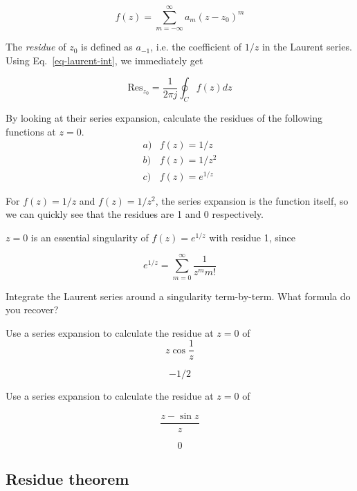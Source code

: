 \begin{equation}
f(z)= \sum_{m=-\infty}^{\infty} a_m (z-z_0)^m
\end{equation} 

The \emph{residue} of $z_0$ is defined as $a_{-1}$, i.e. the coefficient of $1/z$ in the Laurent series. Using Eq.~\ref{eq-laurent-int}, we immediately get

\begin{equation}
\mathrm{Res}_{z_0}=\frac{1}{2 \pi j }  \oint_{{C}} f(z) dz \label{eq-res-int}
\end{equation}

\begin{cue}
  By looking at their series expansion, calculate the residues of the following functions at $z=0$.
  $$\begin{array}{lcll}a) & f(z)=1/z \\b) & f(z)=1/z^2 \\c) & f(z)=e^{1/z}\end{array}$$
\end{cue}

For $f(z)=1/z$ and $f(z)=1/z^2$, the series expansion is the function itself, so we can quickly see that the residues are 1 and 0 respectively.

$z=0$ is an essential singularity of $f(z)=e^{1/z}$ with residue 1, since

$$e^{1/z} = \sum_{m=0}^{\infty} \frac{1}{z^m m!} $$

\begin{exer}
  Integrate the Laurent series around a singularity term-by-term. What formula do you recover?
\end{exer}

\begin{exer}
  Use a series expansion to calculate the residue at $z=0$ of
  $$z \cos \frac{1}{z}$$
  \begin{sol}
    $$-1/2$$
  \end{sol}
\end{exer}

\begin{exer}
  Use a series expansion to calculate the residue at $z=0$ of

  $$\frac{z - \sin z}{z}$$
  \begin{sol}
    $$0$$
  \end{sol}
\end{exer}


\subsection*{Residue theorem}

